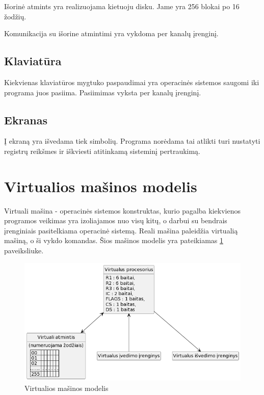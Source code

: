 \documentclass{VUMIFInfKursinis}
\begin{document}
Išorinė atmints yra realizuojama kietuoju disku. Jame yra 256 blokai po 16 žodžių.

Komunikacija su išorine atmintimi yra vykdoma per kanalų įrenginį.

\subsection{Klaviatūra}

Kiekvienas klaviatūros mygtuko paspaudimai yra operacinės sistemos saugomi iki programa juos pasiima. Pasiimimas vyksta per kanalų įrenginį.

\subsection{Ekranas}

Į ekraną yra išvedama tiek simbolių. Programa norėdama tai  atlikti turi nustatyti registrų reikšmes ir iškviesti atitinkamą sisteminį pertraukimą.

\section{Virtualios mašinos modelis}

Virtuali mašina - operacinės sistemos konstruktas, kurio pagalba kiekvienos programos veikimas yra izoliajamos nuo visų kitų, o darbui su bendrais įrenginiais pasitelkiama operacinė sistemą. Reali mašina paleidžia virtualią mašiną, o ši vykdo komandas. Šios mašinos modelis yra pateikiamas \ref{img:virtuali_masina} paveiksliuke.

\begin{figure}[H]
	\centering	
	\includegraphics[scale=0.65]{img/virtuali_masina}
	\caption{Virtualios mašinos modelis}   %
	\label{img:virtuali_masina}
\end{figure}
\end{document}
